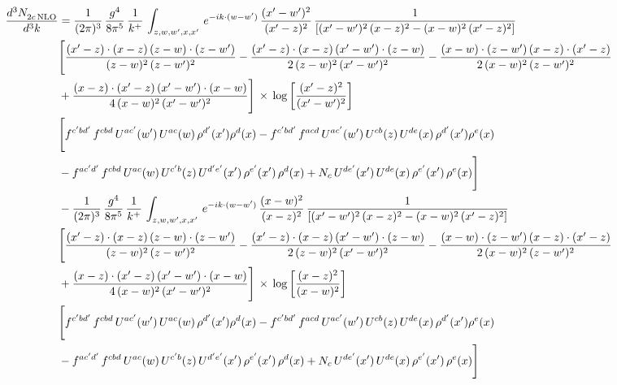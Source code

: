 \documentclass[9pt]{article}
\numberwithin{equation}{section}
\begin{document}
\begin{align}
    \frac{d^{3}N_{2c\,\rm NLO}^{\rm}}{d^{3}k}  & =  \frac{1}{(2\pi)^{3}}\, \frac{g^{4}}{8\pi^{5}}\,\frac{1}{k^{+}}\,\int_{z,w,w^{\prime},x,x'}\, e^{-ik\cdot (w-w')}\,\frac{(x'-w')^{2}}{(x'-z)^{2}}\, \frac{1}{\left[(x'-w')^{2}\, (x-z)^{2} - (x-w)^{2}\, (x'-z)^{2}\right]} \notag \\ & \Bigg[\frac{(x'-z)\cdot (x-z)\, (z-w)\cdot (z-w')}{(z-w)^{2}\, (z-w')^{2}}-\frac{(x'-z)\cdot (x-z)\, (x'-w')\cdot (z-w)}{2\, (z-w)^{2}\, (x'-w')^{2}} -\frac{(x-w)\cdot (z-w')\, (x-z)\cdot (x'-z)}{2\, (x-w)^{2}\, (z-w')^{2}}\notag \\ & +\frac{(x-z)\cdot (x'-z)\, (x'-w')\cdot (x-w)}{4\, (x-w)^{2}\, (x'-w')^{2}}\Bigg]\,\times\, \log{\left[\frac{(x'-z)^{2}}{(x'-w')^{2}}\right]} \notag \\ &  \Bigg[f^{c'bd'}\,f^{cbd}\, U^{ac'}(w')\,U^{ac}(w)\,\rho^{d'}(x')\rho^{d}(x)- f^{c'bd'}\,f^{acd}\,U^{ac'}(w')\,U^{cb}(z)\,U^{de}(x)\,\rho^{d'}(x')\rho^{e}(x) \notag \\ & -f^{ac'd'}\,f^{cbd}\,U^{ac}(w)\,U^{c'b}(z)\,U^{d'e'}(x')\,\rho^{e'}(x')\,\rho^{d}(x) +N_{c}\,U^{de'}(x')\,U^{de}(x)\,\rho^{e'}(x')\,\rho^{e}(x)\Bigg] \notag \\
& -\frac{1}{(2\pi)^{3}}\, \frac{g^{4}}{8\pi^{5}}\,\frac{1}{k^{+}}\,\int_{z,w,w^{\prime},x,x'}\, e^{-ik\cdot (w-w')}\,\frac{(x-w)^{2}}{(x-z)^{2}}\, \frac{1}{\left[(x'-w')^{2}\, (x-z)^{2} - (x-w)^{2}\, (x'-z)^{2}\right]} \notag \\ & \Bigg[\frac{(x'-z)\cdot (x-z)\, (z-w)\cdot (z-w')}{(z-w)^{2}\, (z-w')^{2}}-\frac{(x'-z)\cdot (x-z)\, (x'-w')\cdot (z-w)}{2\, (z-w)^{2}\, (x'-w')^{2}} -\frac{(x-w)\cdot (z-w')\, (x-z)\cdot (x'-z)}{2\, (x-w)^{2}\, (z-w')^{2}}\notag \\ & +\frac{(x-z)\cdot (x'-z)\, (x'-w')\cdot (x-w)}{4\, (x-w)^{2}\, (x'-w')^{2}}\Bigg]\,\times\, \log{\left[\frac{(x-z)^{2}}{(x-w)^{2}}\right]} \notag \\ &  \Bigg[f^{c'bd'}\,f^{cbd}\, U^{ac'}(w')\,U^{ac}(w)\,\rho^{d'}(x')\rho^{d}(x)- f^{c'bd'}\,f^{acd}\,U^{ac'}(w')\,U^{cb}(z)\,U^{de}(x)\,\rho^{d'}(x')\rho^{e}(x) \notag \\ & -f^{ac'd'}\,f^{cbd}\,U^{ac}(w)\,U^{c'b}(z)\,U^{d'e'}(x')\,\rho^{e'}(x')\,\rho^{d}(x) +N_{c}\,U^{de'}(x')\,U^{de}(x)\,\rho^{e'}(x')\,\rho^{e}(x)\Bigg]
\end{align}
\end{document}
